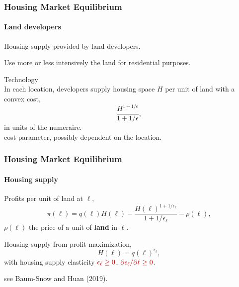 \documentclass[aspectratio=169]{beamer}
\begin{document}



\begin{v75mins}
\begin{frame}[label=landdevelopers]
\frametitle{Housing Market Equilibrium}
\framesubtitle{Land developers}
\bi
\item Housing supply provided by land developers. \hyperlink{comics}{}
\item Use more or less intensively the land for residential purposes.
\item Technology\\
\medskip
In each location, developers supply housing space $H$ per unit of land with a convex cost,
\begin{equation*}
\frac{H^{1+1/\epsilon}}{1+1/\epsilon},
\end{equation*}
in units of the numeraire.\\
 \re{$\epsilon=$} cost parameter, possibly dependent on the location.
\ei
\end{frame}

\begin{frame}
\frametitle{Housing Market Equilibrium}
\framesubtitle{Housing supply}
\bi
\item Profits per unit of land at $\ell$,
\begin{equation*}
\pi(\ell)=q(\ell)H(\ell)-\frac{H(\ell)^{1+1/\epsilon_{\ell}}}{ 1+1/\epsilon_{\ell} }- \rho(\ell),
\end{equation*}
$\rho(\ell)$ the price of a unit of \textbf{land} in $\ell$.
\item Housing supply from profit maximization,
\begin{equation*}
H(\ell)=q(\ell) ^{\epsilon_{\ell}},
\end{equation*}
with housing supply elasticity  $\re{\epsilon_{\ell}\geq 0}$, $\re{\partial\epsilon_{\ell}/\partial \ell \geq 0}$.

see Baum-Snow and Huan (2019).  %
\ei
\end{frame}


\end{v75mins}
\end{document}
